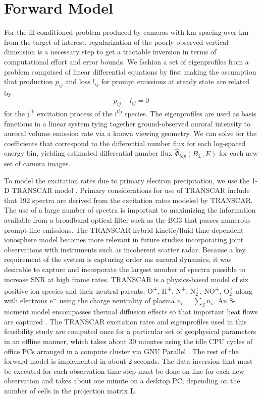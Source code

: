 \section{Forward Model}\label{sec:fwd}
For the ill-conditioned problem produced by cameras with \unit[3]{km} spacing over \unit[100]{km} from the target of interest, regularization of the poorly observed vertical dimension is a necessary step to get a tractable inversion in terms of computational effort and error bounds.
We fashion a set of eigenprofiles from a problem comprised of linear differential equations by first making the assumption that production $p_{ij}$ and loss $l_{ij}$ for prompt emissions at steady state are related by
\begin{equation}\label{eq:continuity}
p_{ij} - l_{ij} = 0
\end{equation}
for the j\textsuperscript{th} excitation process of the i\textsuperscript{th} species.
The eigenprofiles are used as basis functions \citep{dahlgren2013} in a linear system tying together ground-observed auroral intensity to auroral volume emission rate via a known viewing geometry.
We can solve for the coefficients that correspond to the differential number flux for each log-spaced energy bin, yielding estimated differential number flux $\hat{\Phi}_{top}(B_\perp,E)$ for each new set of camera images.

To model the excitation rates due to primary electron precipitation, we use the 1-D TRANSCAR model \citep{lilensten2002,zett2007,zett2008,dahlgren2013,lummmerzheim1994}. 
Primary considerations for use of TRANSCAR include that 192 spectra are derived \citep{zettdis} from the excitation rates modeled by TRANSCAR. 
The use of a large number of spectra is important to maximizing the information available from a broadband optical filter such as the BG3 that passes numerous prompt line emissions.
The TRANSCAR hybrid kinetic/fluid time-dependent ionosphere model becomes more relevant in future studies incorporating joint observations with instruments such as incoherent scatter radar. 
Because a key requirement of the system is capturing order \unit[10]{ms} auroral dynamics, it was desirable to capture and incorporate the largest number of spectra possible to increase SNR at high frame rates.
TRANSCAR is a physics-based model of six positive ion species and their neutral parents: O\textsuperscript+, H\textsuperscript+, N\textsuperscript+, N$^+_2$, NO\textsuperscript+, O$^+_2$ along with electrons e$^-$ using the charge neutrality \citep{zett2007,blelly1996a,lilensten2002} of plasma $n_e = \sum_S n_s$. 
An 8-moment model \citep{blelly1996a} encompasses thermal diffusion effects so that important heat flows are captured \citep{zett2007}.
The TRANSCAR excitation rates and eigenprofiles used in this feasibility study are computed once for a particular set of geophysical parameters in an offline manner, which takes about 30 minutes using the idle CPU cycles of office PCs arranged in a compute cluster via GNU Parallel \citep{tange2011a}.
The rest of the forward model is implemented in about 2 seconds. 
The data inversion that must be executed for each observation time step must be done on-line for each new observation and takes about one minute on a desktop PC, depending on the number of cells in the projection matrix $\mathbf{L}$.

